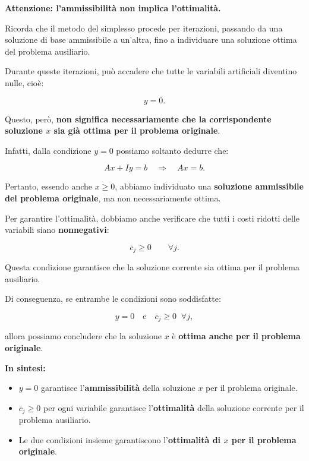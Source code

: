 \begin{warning}
    \textbf{Attenzione: l'ammissibilità non implica l'ottimalità.}

    Ricorda che il metodo del simplesso procede per iterazioni,
    passando da una soluzione di base ammissibile a un'altra,
    fino a individuare una soluzione ottima del problema ausiliario.

    Durante queste iterazioni, può accadere che tutte le variabili
    artificiali diventino nulle, cioè:

    \[
    y=0.
    \]

    Questo, però, \textbf{non significa necessariamente che la
    corrispondente soluzione $x$ sia già ottima per il problema
    originale}.

    Infatti, dalla condizione $y=0$ possiamo soltanto dedurre che:

    \[
    Ax+Iy=b
    \quad\Longrightarrow\quad
    Ax=b.
    \]

    Pertanto, essendo anche $x\geq 0$, abbiamo individuato
    una \textbf{soluzione ammissibile del problema originale},
    ma non necessariamente ottima.

    Per garantire l'ottimalità, dobbiamo anche verificare
    che tutti i costi ridotti delle variabili siano
    \textbf{nonnegativi}:

    \[
    \boxed{\overline{c}_j\geq 0 \qquad \forall j.}
    \]

    Questa condizione garantisce che la soluzione corrente
    sia ottima per il problema ausiliario.

    Di conseguenza, se entrambe le condizioni sono soddisfatte:

    \[
    \boxed{
    y=0
    \quad\text{e}\quad
    \overline{c}_j\geq 0 \;\; \forall j,
    }
    \]

    allora possiamo concludere che la soluzione $x$ è
    \textbf{ottima anche per il problema originale}.

    \medskip
    \noindent
    \textbf{In sintesi:}
    \begin{itemize}
        \item $y=0$ garantisce l'\textbf{ammissibilità}
        della soluzione $x$ per il problema originale.
        \item $\overline{c}_j\geq 0$ per ogni variabile garantisce
        l'\textbf{ottimalità} della soluzione corrente
        per il problema ausiliario.
        \item Le due condizioni insieme garantiscono
        l'\textbf{ottimalità di $x$ per il problema originale}.
    \end{itemize}
\end{warning}

